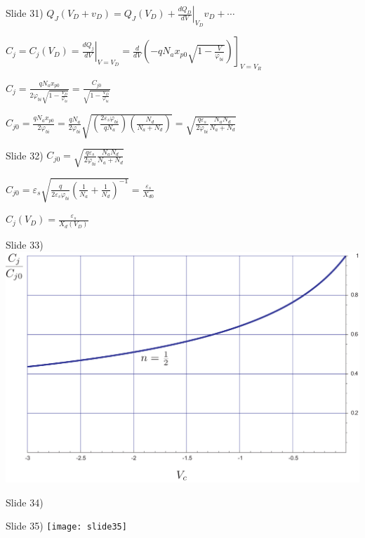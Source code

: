 \documentclass{beamer}
\begin{document}
\begin{frame}{Slide 31)}
${Q_J}({V_D} + {v_D}) = {Q_J}({V_D}) + {\left. {\frac{{d{Q_D}}}{{dV}}} \right|_{{V_D}}}{v_D} +  \cdots $

$C_j^{} = {C_j}({V_D}) = {\left. {\frac{{dQ_j^{}}}{{dV}}} \right|_{V = {V_D}}} = {\left. {\frac{d}{{dV}}\left( { - q{N_a}{x_{p0}}\sqrt {1 - \frac{V}{{{\varphi _{bi}}}}} } \right)} \right]_{V = {V_R}}}$

${C_j} = \frac{{q{N_a}{x_{p0}}}}{{2{\varphi _{bi}}\sqrt {1 - \frac{{{V_D}}}{{{\varphi _{bi}}}}} }} = \frac{{C_{j0}^{}}}{{\sqrt {1 - \frac{{{V_D}}}{{{\varphi _{bi}}}}} }}$

${C_{j0}} = \frac{{q{N_a}{x_{p0}}}}{{2{\varphi _{bi}}}} = \frac{{q{N_a}}}{{2{\varphi _{bi}}}}\sqrt {\left( {\frac{{2{\varepsilon _s}{\varphi _{bi}}}}{{q{N_a}}}} \right)\left( {\frac{{{N_d}}}{{{N_a} + {N_d}}}} \right)}  = \sqrt {\frac{{q{\varepsilon _s}}}{{2{\varphi _{bi}}}}\frac{{{N_a}{N_d}}}{{{N_a} + {N_d}}}} $
\end{frame}

\begin{frame}{Slide 32)}
${C_{j0}} = \sqrt {\frac{{q{\varepsilon _s}}}{{2{\varphi _{bi}}}}\frac{{{N_a}{N_d}}}{{{N_a} + {N_d}}}} $

${C_{j0}} = {\varepsilon _s}\sqrt {\frac{q}{{2{\varepsilon _s}{\varphi _{bi}}}}{{\left( {\frac{1}{{{N_a}}} + \frac{1}{{{N_d}}}} \right)}^{ - 1}}}  = \frac{{{\varepsilon _s}}}{{{X_{d0}}}}$

$C_j^{}({V_D}) = \frac{{{\varepsilon _s}}}{{{X_d}({V_D})}}$

\end{frame}

\begin{frame}{Slide 33)}
\includegraphics[width=.6\columnwidth]{slide33}
\end{frame}

\begin{frame}{Slide 34)}
\end{frame}

\begin{frame}{Slide 35)}
\texttt{[image: slide35]}
\end{frame}
\end{document}
